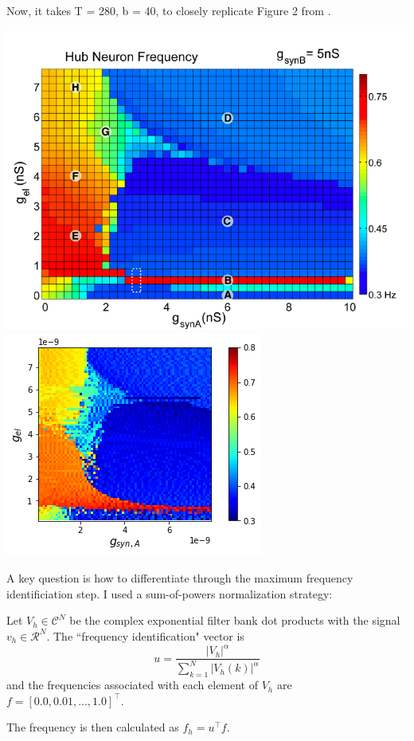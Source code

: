 \documentclass[11pt]{article}
\begin{document}
Now, it takes T = 280, b = 40, to closely replicate Figure 2 from \cite{gutierrez2013multiple}.

\begin{center}
\includegraphics[scale=0.3]{figs/Gutierrez2013_Fig2.png}
\includegraphics[scale=0.6]{figs/Fig2_rep.png}
\end{center}

A key question is how to differentiate through the maximum frequency identificiation step.  I used a sum-of-powers normalization strategy:

Let $V_h \in \mathcal{C}^N$ be the complex exponential filter bank dot products with the signal $v_h \in \mathcal{R}^N$.  The ``frequency identification" vector is 
\[u = \frac{|V_h|^\alpha}{\sum_{k=1}^N |V_h(k)|^\alpha} \] and the frequencies associated with each element of $V_h$ are $f = \left[ 0.0, 0.01, ..., 1.0 \right]^\top$.

The frequency is then calculated as $f_h = u^\top f$.
\end{document}
